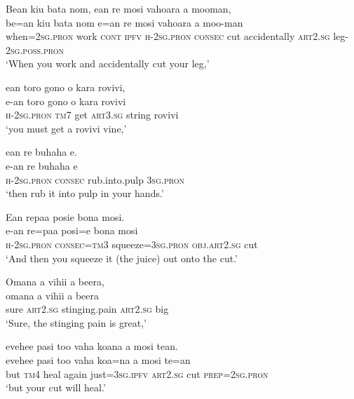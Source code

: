 \ea\label{ex:text7-66}
Bean kiu bata nom, ean re mosi vahoara a mooman,\\
\gll be=an	kiu	bata	nom	e=an	re	mosi	vahoara	a	moo-man\\
     when=2\textsc{sg}.\textsc{pron}	work	\textsc{cont}	\textsc{ipfv}	\textsc{h}-2\textsc{sg}.\textsc{pron}	\textsc{consec}	cut	accidentally	\textsc{art}2.\textsc{sg}	leg-2\textsc{sg}.\textsc{poss}.\textsc{pron}\\
\glt `When you work and accidentally cut your leg,'
\z

\ea\label{ex:text7-67}
ean toro gono o kara rovivi,\\
\gll e-an	toro	gono	o	kara	rovivi\\
     \textsc{h}-2\textsc{sg}.\textsc{pron}	\textsc{tm}7	get	\textsc{art}3.\textsc{sg}	string	rovivi\\
\glt `you must get a rovivi vine,'
\z

\ea\label{ex:text7-68}
ean re buhaha e.\\
\gll e-an	re	buhaha	e\\
     \textsc{h}-2\textsc{sg}.\textsc{pron}	\textsc{consec}	rub.into.pulp	3\textsc{sg}.\textsc{pron}\\
\glt `then rub it into pulp in your hands.'
\z

\ea\label{ex:text7-69}
Ean repaa posie bona mosi.\\
\gll e-an	re=paa	posi=e	bona	mosi\\
     \textsc{h}-2\textsc{sg}.\textsc{pron}	\textsc{consec}=\textsc{tm}3	squeeze=3\textsc{sg}.\textsc{pron}	\textsc{obj}.\textsc{art}2.\textsc{sg}	cut\\
\glt `And then you squeeze it (the juice) out onto the cut.'
\z

\ea\label{ex:text7-70}
Omana a vihii a beera,\\
\gll omana	a	vihii	a	beera\\
     sure	\textsc{art}2.\textsc{sg}	stinging.pain	\textsc{art}2.\textsc{sg}	big\\
\glt `Sure, the stinging pain is great,'
\z

\ea\label{ex:text7-71}
evehee pasi too vaha koana a mosi tean.\\
\gll evehee	pasi	too	vaha	koa=na	a	mosi	te=an\\
     but	\textsc{tm}4	heal	again	just=3\textsc{sg}.\textsc{ipfv}	\textsc{art}2.\textsc{sg}	cut	\textsc{prep}=2\textsc{sg}.\textsc{pron}\\
\glt `but your cut will heal.'
\z

